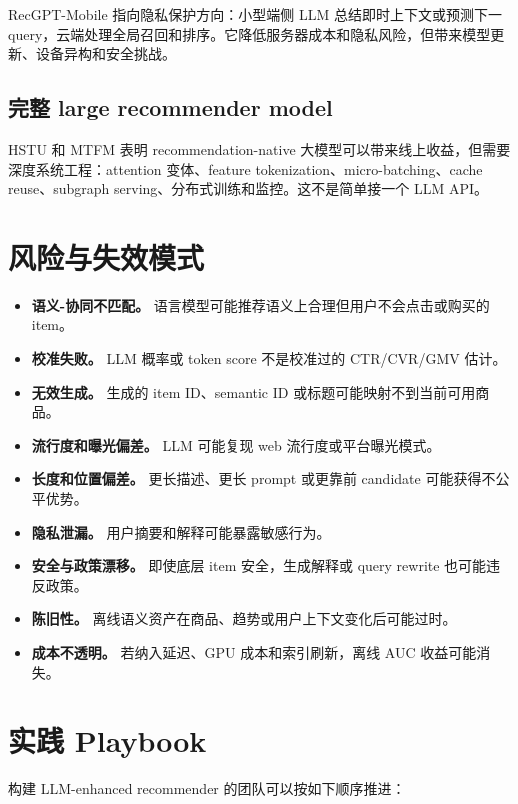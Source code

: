 \documentclass[UTF8,fontset=fandol,11pt]{ctexart}
\begin{document}
RecGPT-Mobile 指向隐私保护方向：小型端侧 LLM 总结即时上下文或预测下一 query，云端处理全局召回和排序。它降低服务器成本和隐私风险，但带来模型更新、设备异构和安全挑战。

\subsection{完整 large recommender model}

HSTU 和 MTFM 表明 recommendation-native 大模型可以带来线上收益，但需要深度系统工程：attention 变体、feature tokenization、micro-batching、cache reuse、subgraph serving、分布式训练和监控。这不是简单接一个 LLM API。

\section{风险与失效模式}

\begin{itemize}
  \item \textbf{语义-协同不匹配。} 语言模型可能推荐语义上合理但用户不会点击或购买的 item。
  \item \textbf{校准失败。} LLM 概率或 token score 不是校准过的 CTR/CVR/GMV 估计。
  \item \textbf{无效生成。} 生成的 item ID、semantic ID 或标题可能映射不到当前可用商品。
  \item \textbf{流行度和曝光偏差。} LLM 可能复现 web 流行度或平台曝光模式。
  \item \textbf{长度和位置偏差。} 更长描述、更长 prompt 或更靠前 candidate 可能获得不公平优势。
  \item \textbf{隐私泄漏。} 用户摘要和解释可能暴露敏感行为。
  \item \textbf{安全与政策漂移。} 即使底层 item 安全，生成解释或 query rewrite 也可能违反政策。
  \item \textbf{陈旧性。} 离线语义资产在商品、趋势或用户上下文变化后可能过时。
  \item \textbf{成本不透明。} 若纳入延迟、GPU 成本和索引刷新，离线 AUC 收益可能消失。
\end{itemize}

\section{实践 Playbook}

构建 LLM-enhanced recommender 的团队可以按如下顺序推进：
\end{document}
